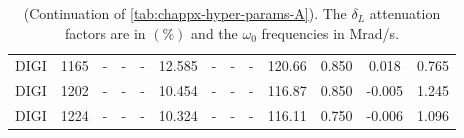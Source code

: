 \begin{sidewaystable}[h]
\begin{tabular}{ccccccccccccc}
DIGI &    1165  &         - &         - &         - &      12.585  &    - &    - &    - & 120.66 &      0.850 &    0.018 &      0.765 \\
DIGI &    1202  &         - &         - &         - &      10.454  &    - &    - &    - & 116.87 &      0.850 &   -0.005 &      1.245 \\
DIGI &    1224  &         - &         - &         - &      10.324  &    - &    - &    - & 116.11 &      0.750 &   -0.006 &      1.096 \\
\bottomrule
\end{tabular}
\caption{(Continuation of \cref{tab:chappx-hyper-params-A}). The $\delta_L$ attenuation factors are in $(\%)$ and the $\omega_{0}$ frequencies in Mrad/s.}
\label{tab:chappx-hyper-params-B}
\end{sidewaystable}
